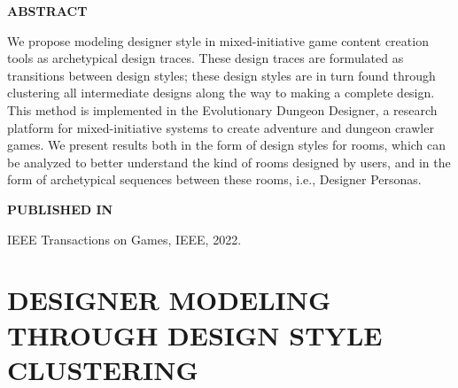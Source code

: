 \graphicspath{{included-papers-tex/paper-10/}}



\normalfont
\textbf{\textsc{ABSTRACT}}

We propose modeling designer style in mixed-initiative game content creation tools as archetypical design traces. These design traces are formulated as transitions between design styles; these design styles are in turn found through clustering all intermediate designs along the way to making a complete design. This method is implemented in the Evolutionary Dungeon Designer, a research platform for mixed-initiative systems to create adventure and dungeon crawler games. We present results both in the form of design styles for rooms, which can be analyzed to better understand the kind of rooms designed by users, and in the form of archetypical sequences between these rooms, i.e., Designer Personas. 

\textbf{\textsc{PUBLISHED IN}}

IEEE Transactions on Games, IEEE, 2022.

\section*{DESIGNER MODELING THROUGH DESIGN STYLE CLUSTERING}




% 

% 




